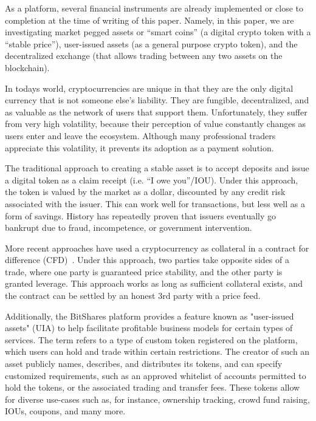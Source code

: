As a platform, several financial instruments are already implemented or close
to completion at the time of writing of this paper. Namely, in this paper, we
are investigating market pegged assets or ``smart coins'' (a digital crypto
token with a ``stable price''), user-issued assets (as a general purpose crypto
token), and the decentralized exchange (that allows trading between any two assets
on the blockchain).

In todays world, cryptocurrencies are unique in that they are the only digital
currency that is not someone else's liability. They are fungible,
decentralized, and as valuable as the network of users that support them.
Unfortunately, they suffer from very high volatility, because their perception
of value constantly changes as users enter and leave the ecosystem. Although
many professional traders appreciate this volatility, it prevents its adoption
as a payment solution.

The traditional approach to creating a stable asset is to accept deposits and
issue a digital token as a claim receipt (i.e. ``I owe you''/IOU). Under this
approach, the token is valued by the market as a dollar, discounted by any
credit risk associated with the issuer. This can work well for transactions,
but less well as a form of savings. History has repeatedly proven that issuers
eventually go bankrupt due to fraud, incompetence, or government intervention.

More recent approaches have used a cryptocurrency as collateral in a contract
for difference (CFD)~\cite{def:cfd}. Under this approach, two parties take
opposite sides of a trade, where one party is guaranteed price stability, and
the other party is granted leverage. This approach works as long as sufficient
collateral exists, and the contract can be settled by an honest 3rd party with
a price feed.

Additionally, the BitShares platform provides a feature known as "user-issued
assets" (UIA) to help facilitate profitable business models for certain types
of services.  The term refers to a type of custom token registered on the
platform, which users can hold and trade within certain restrictions. The
creator of such an asset publicly names, describes, and distributes its
tokens, and can specify customized requirements, such as an approved whitelist
of accounts permitted to hold the tokens, or the associated trading and
transfer fees. These tokens allow for diverse use-cases such as, for instance,
ownership tracking, crowd fund raising, IOUs, coupons, and many more.

